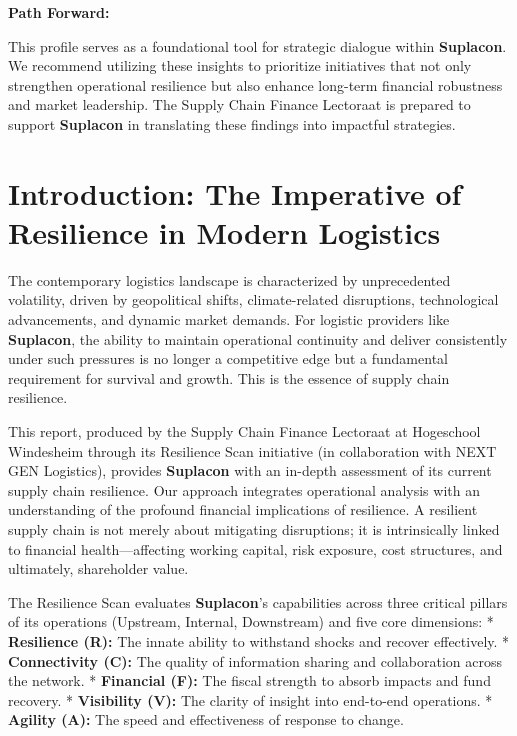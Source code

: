 \documentclass[
  oneside,
  open=any,
  fontsize=11pt]{scrbook}
\begin{document}
\textbf{Path Forward:}

This profile serves as a foundational tool for strategic dialogue within
\textbf{Suplacon}. We recommend utilizing these insights to prioritize
initiatives that not only strengthen operational resilience but also
enhance long-term financial robustness and market leadership. The Supply
Chain Finance Lectoraat is prepared to support \textbf{Suplacon} in
translating these findings into impactful strategies.

\newpage

\chapter{Introduction: The Imperative of Resilience in Modern
Logistics}\label{introduction-the-imperative-of-resilience-in-modern-logistics}

The contemporary logistics landscape is characterized by unprecedented
volatility, driven by geopolitical shifts, climate-related disruptions,
technological advancements, and dynamic market demands. For logistic
providers like \textbf{Suplacon}, the ability to maintain operational
continuity and deliver consistently under such pressures is no longer a
competitive edge but a fundamental requirement for survival and growth.
This is the essence of supply chain resilience.

This report, produced by the Supply Chain Finance Lectoraat at
Hogeschool Windesheim through its Resilience Scan initiative (in
collaboration with NEXT GEN Logistics), provides \textbf{Suplacon} with
an in-depth assessment of its current supply chain resilience. Our
approach integrates operational analysis with an understanding of the
profound financial implications of resilience. A resilient supply chain
is not merely about mitigating disruptions; it is intrinsically linked
to financial health---affecting working capital, risk exposure, cost
structures, and ultimately, shareholder value.

The Resilience Scan evaluates \textbf{Suplacon}'s capabilities across
three critical pillars of its operations (Upstream, Internal,
Downstream) and five core dimensions: * \textbf{Resilience (R):} The
innate ability to withstand shocks and recover effectively. *
\textbf{Connectivity (C):} The quality of information sharing and
collaboration across the network. * \textbf{Financial (F):} The fiscal
strength to absorb impacts and fund recovery. * \textbf{Visibility (V):}
The clarity of insight into end-to-end operations. * \textbf{Agility
(A):} The speed and effectiveness of response to change.
\end{document}
